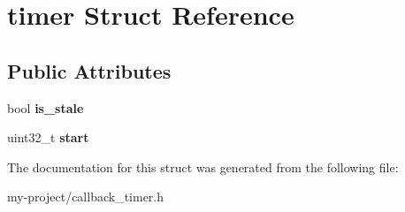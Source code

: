 \hypertarget{structtimer}{}\section{timer Struct Reference}
\label{structtimer}
\subsection*{Public Attributes}
\begin{DoxyCompactItemize}
\item 
\mbox{\label{structtimer_a4c7e94e8c2a521b852e82e08d78b1cb8}} 
bool {\bfseries is\+\_\+stale}
\item 
\mbox{\label{structtimer_a6ece3d857398d2940503e08f5582a6a4}} 
uint32\+\_\+t {\bfseries start}
\end{DoxyCompactItemize}


The documentation for this struct was generated from the following file\+:\begin{DoxyCompactItemize}
\item 
my-\/project/callback\+\_\+timer.\+h\end{DoxyCompactItemize}
